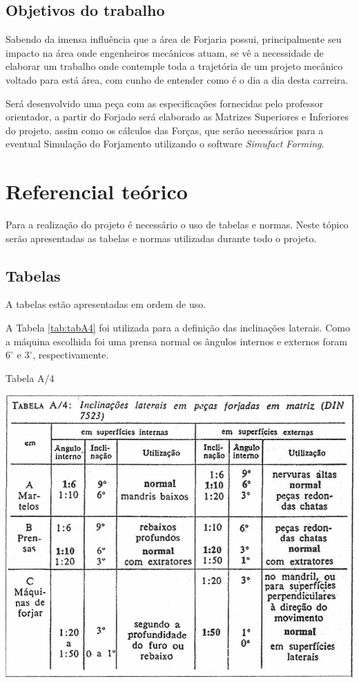 \documentclass[deposito, acronym, symbols]{fei}
\begin{document}
\section{Objetivos do trabalho}

Sabendo da imensa influência que a área de Forjaria possui, principalmente seu impacto na área onde engenheiros mecânicos atuam, se vê a necessidade de elaborar um trabalho onde contemple toda a trajetória de um projeto mecânico voltado para está área, com cunho de entender como é o dia a dia desta carreira.


Será desenvolvido uma peça com as especificações fornecidas pelo professor orientador, a partir do Forjado será elaborado as Matrizes Superiores e Inferiores do projeto, assim como os cálculos das Forças, que serão necessários para a eventual Simulação do Forjamento utilizando o software \textit{Simufact Forming}. 

\chapter{Referencial teórico} \label{tabelas}

Para a realização do projeto é necessário o uso de tabelas e normas. Neste tópico serão apresentadas as tabelas e normas utilizadas durante todo o projeto.

\section{Tabelas} 

A tabelas estão apresentadas em ordem de uso.

A Tabela \ref{tab:tabA4} foi utilizada para a definição das inclinações laterais. Como a máquina escolhida foi uma prensa normal os ângulos internos e externos foram $6^\circ$ e $3^\circ$, respectivamente.

\begin{table}[!htb]
 \centering
    \caption{Tabela A/4}
    \includegraphics[width=1\linewidth]{Imagens/Tabela A4.png}
    \label{tab:tabA4}
\end{table}
\end{document}

